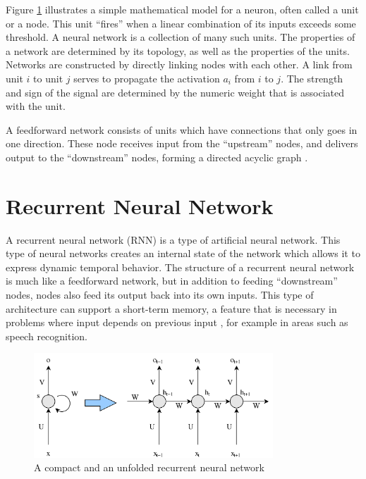 Figure \ref{fig:nn-rnn} illustrates a simple mathematical model for a neuron, often called a unit or a node. This unit ``fires'' when a linear combination of its inputs exceeds some threshold. A neural network is a collection of many such units. The properties of a network are determined by its topology, as well as the properties of the units. Networks are constructed by directly linking nodes with each other. A link from unit \(i\) to unit \(j\) serves to propagate the activation \(a_{i}\) from \(i\) to \(j\). The strength and sign of the signal are determined by the numeric weight that is associated with the unit. 

A feedforward network consists of units which have connections that only goes in one direction. These node receives input from the ``upstream'' nodes, and delivers output to the ``downstream'' nodes, forming a directed acyclic graph \citep{russell2010aimodernapproach}.


\section{Recurrent Neural Network}
\label{sec:reccurent_neural_network}
A recurrent neural network (RNN) is a type of artificial neural network. This type of neural networks creates an internal state of the network which allows it to express dynamic temporal behavior. The structure of a recurrent neural network is much like a feedforward network, but in addition to feeding ``downstream'' nodes, nodes also feed its output back into its own inputs. This type of architecture can support a short-term memory, a feature that is necessary in problems where input depends on previous input \citep{russell2010aimodernapproach}, for example in areas such as speech recognition.

\begin{figure}[ht]
    \centering
    \includegraphics[width=0.8\textwidth]{fig/related_work/nn_recurrent.png}
    \caption{A compact and an unfolded recurrent neural network}
    \label{fig:nn-rnn}
\end{figure}

